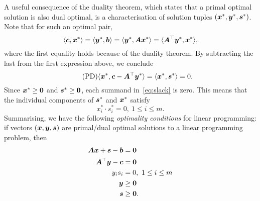 A useful consequence of the duality theorem, which states that a primal optimal solution is also dual optimal, is a characterisation of solution tuples $(\bm{x}^*,\bm{y}^*,\bm{s}^*)$. Note that for such an optimal pair,
\begin{equation*}
 \langle {\bm{c}}, {\bm{x}^*} \rangle = \langle {\bm{y}^*}, {\bm{b}} \rangle = \langle {\bm{y}^*}, {\bm{A}\bm{x}^*} \rangle = \langle {\bm{A}^{\top}\bm{y}^*}, {\bm{x}^*} \rangle,
\end{equation*}
where the first equality holds because of the duality theorem. By subtracting the last from the first expression above, we conclude
\begin{equation}\label{eq:slack}\tag{PD}
 \langle {\bm{x}^*}, {\bm{c}-\bm{A}^{\top}\bm{y}^*} \rangle=\langle {\bm{x}^*}, {\bm{s}^*} \rangle=0.
\end{equation}
Since $\bm{x}^*\geq \bm{0}$ and $\bm{s}^*\geq \bm{0}$, each summand in~\eqref{eq:slack} is zero. This means that the individual components of $\bm{s}^*$ and $\bm{x}^*$ satisfy
\begin{equation*}
 x^*_i \cdot s^*_i = 0, \ 1\leq i\leq m.
\end{equation*}
Summarising, we have the following {\em optimality conditions} for linear programming:
if vectors $(\bm{x},\bm{y},\bm{s})$ are primal/dual optimal solutions to a linear programming problem, then
\begin{align}\label{eq:opt}
\begin{split}
 \bm{A}\bm{x}+\bm{s}-\bm{b} & = \bm{0}\\
 \bm{A}^{\top}\bm{y}-\bm{c} & = \bm{0}\\
 y_is_i &= 0, \ 1\leq i\leq m\\
 \bm{y}& \geq \bm{0}\\
 \bm{s}& \geq \bm{0}.
 \end{split}
\end{align}

